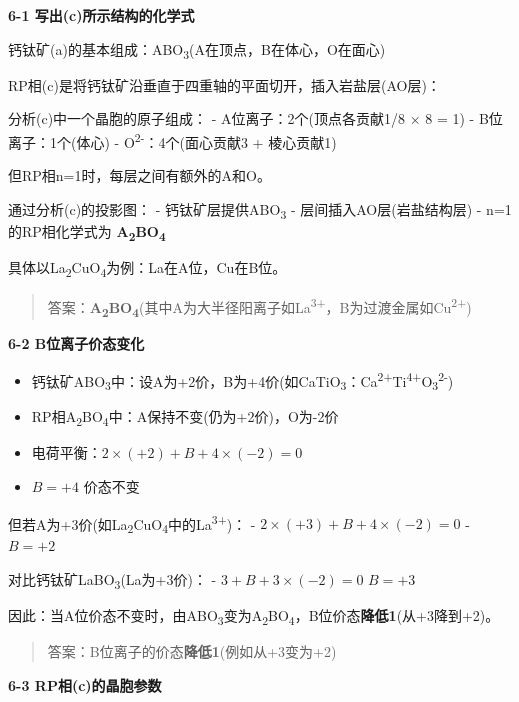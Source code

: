 \textbf{6-1 写出(c)所示结构的化学式}

钙钛矿(a)的基本组成：ABO\textsubscript{3}(A在顶点，B在体心，O在面心)

RP相(c)是将钙钛矿沿垂直于四重轴的平面切开，插入岩盐层(AO层)：

分析(c)中一个晶胞的原子组成：
- A位离子：2个(顶点各贡献1/8 × 8 = 1)
- B位离子：1个(体心)
- O\textsuperscript{2-}：4个(面心贡献3 + 棱心贡献1)

但RP相n=1时，每层之间有额外的A和O。

通过分析(c)的投影图：
- 钙钛矿层提供ABO\textsubscript{3}
- 层间插入AO层(岩盐结构层)
- n=1的RP相化学式为 \textbf{A\textsubscript{2}BO\textsubscript{4}}

具体以La\textsubscript{2}CuO\textsubscript{4}为例：La在A位，Cu在B位。

\begin{quote}
答案：\textbf{A\textsubscript{2}BO\textsubscript{4}}(其中A为大半径阳离子如La\textsuperscript{3+}，B为过渡金属如Cu\textsuperscript{2+})
\end{quote}

\textbf{6-2 B位离子价态变化}

\begin{itemize}
\tightlist
\item
  钙钛矿ABO\textsubscript{3}中：设A为+2价，B为+4价(如CaTiO\textsubscript{3}：Ca\textsuperscript{2+}Ti\textsuperscript{4+}O\textsubscript{3}\textsuperscript{2-})
\item
  RP相A\textsubscript{2}BO\textsubscript{4}中：A保持不变(仍为+2价)，O为-2价
\item
  电荷平衡：\(2 \times (+2) + B + 4 \times (-2) = 0\)
\item
  \(B = +4\) \箭 价态不变
\end{itemize}

但若A为+3价(如La\textsubscript{2}CuO\textsubscript{4}中的La\textsuperscript{3+})：
- \(2 \times (+3) + B + 4 \times (-2) = 0\)
- \(B = +2\)

对比钙钛矿LaBO\textsubscript{3}(La为+3价)：
- \(3 + B + 3 \times (-2) = 0\) \箭 \(B = +3\)

因此：当A位价态不变时，由ABO\textsubscript{3}变为A\textsubscript{2}BO\textsubscript{4}，B位价态\textbf{降低1}(从+3降到+2)。

\begin{quote}
答案：B位离子的价态\textbf{降低1}(例如从+3变为+2)
\end{quote}

\textbf{6-3 RP相(c)的晶胞参数}

